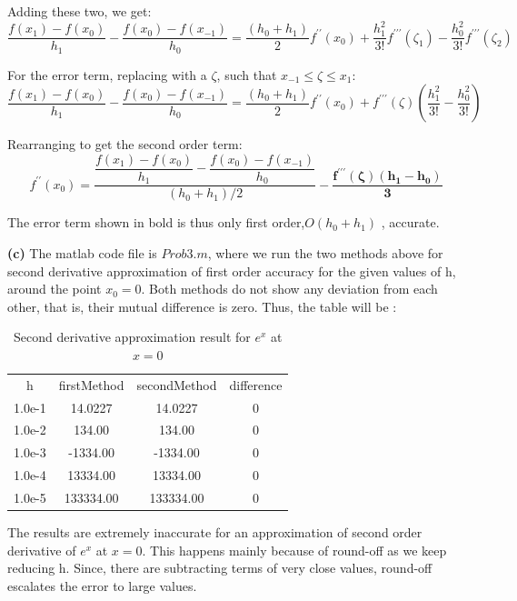 \documentclass{article}
\renewcommand\part[1]{\vspace{.10in}\textbf{(#1)}}
\begin{document}
  Adding these two, we get:
  \[\dfrac{f(x_1) - f(x_0)}{h_1} - \dfrac{f(x_{0}) - f(x_{-1})}{h_0} = \dfrac{(h_0 + h_1)}{2}f^{\prime\prime}(x_0) + \dfrac{h_1^2}{3!}f^{\prime\prime\prime}(\zeta_1) - \dfrac{h_0^2}{3!}f^{\prime\prime\prime}(\zeta_2)\]

  For the error term, replacing with a $\zeta$, such that $x_{-1} \leq \zeta \leq x_1$:
  \[\dfrac{f(x_1) - f(x_0)}{h_1} - \dfrac{f(x_{0}) - f(x_{-1})}{h_0} = \dfrac{(h_0 + h_1)}{2}f^{\prime\prime}(x_0) + f^{\prime\prime\prime}(\zeta)(\dfrac{h_1^2}{3!} - \dfrac{h_0^2}{3!})\]

  Rearranging to get the second order term:
  \[f^{\prime\prime}(x_0) = \dfrac{\dfrac{f(x_1) - f(x_0)}{h_1} - \dfrac{f(x_{0}) - f(x_{-1})}{h_0}}{(h_0 + h_1)/2} - \mathbf{\dfrac{f^{\prime\prime\prime}(\zeta)(h_1 - h_0)}{3}}\]

  The error term shown in bold is thus only first order,$O(h_0 + h_1)$ , accurate.

  

  \part{c} The matlab code file is $Prob3.m$, where we run the two methods above for second derivative approximation of first order accuracy for the given values of h, around the point $x_0 = 0$. Both methods do not show any deviation from each other, that is, their mutual difference is zero.
  Thus, the table will be :
  \begin{longtable}{c|c|c|c}
	\caption{Second derivative approximation result for $e^x$ at $x=0$} \\
  \hline\hline
	  h & firstMethod & secondMethod & difference \\ [0.5ex]
	  1.0e-1 & 14.0227 &  14.0227 & 0 \\
	  1.0e-2 & 134.00 &   134.00 & 0 \\
	  1.0e-3 & -1334.00 & -1334.00 & 0 \\
	  1.0e-4 & 13334.00 & 13334.00 & 0 \\
	  1.0e-5 & 133334.00 & 133334.00 & 0  \\
  \hline

  \end{longtable}

	  The results are extremely inaccurate for an approximation of second order derivative of $e^x$ at $x=0$. This happens mainly because of round-off as we keep reducing h. Since, there are subtracting terms of very close values, round-off  escalates the error to large values.
\end{document}

